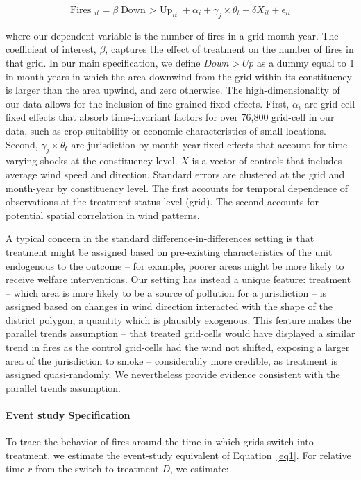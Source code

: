 \documentclass[12pt]{article}
\begin{document}
\begin{equation}\label{eq1}
 \text{Fires }_{i t}=\beta \text{{Down $>$ Up}}_{i t}+ \alpha_{i}+ \gamma_{j} \times \theta_{t}+ \delta X_{it} + \epsilon_{i t}
\end{equation}

where our dependent variable is the number of fires in a grid month-year. The coefficient of interest, $\beta$, captures the effect of treatment on the number of fires in that grid. In our main specification, we define $Down>Up$ as a dummy equal to 1 in month-years in which the area downwind from the grid within its constituency is larger than the area upwind, and zero otherwise. 
The high-dimensionality of our data allows for the inclusion of fine-grained fixed effects. First, $\alpha_{i}$ are grid-cell fixed effects that absorb time-invariant factors for over 76,800 grid-cell in our data, such as crop suitability or economic characteristics of small locations.  Second,  $\gamma_{j} \times \theta_{t}$ are jurisdiction by month-year fixed effects that account for time-varying shocks at the constituency level. $X$ is a vector of controls that includes average wind speed and direction. Standard errors are clustered at the grid and month-year by constituency level. The first accounts for temporal dependence of observations at the treatment status level (grid). The second accounts for potential spatial correlation in wind patterns.

A typical concern in the standard difference-in-differences setting is that treatment might be assigned based on pre-existing characteristics of the unit endogenous to the outcome -- for example, poorer areas might be more likely to receive welfare interventions. Our setting has instead a unique feature: treatment -- which area is more likely to be a source of pollution for a jurisdiction -- is assigned based on changes in wind direction interacted with the shape of the district polygon, a quantity which is plausibly exogenous. This feature makes the parallel trends assumption -- that treated grid-cells would have displayed a similar trend in fires as the control grid-cells had the wind not shifted, exposing a larger area of the jurisdiction to smoke -- considerably more credible, as treatment is assigned quasi-randomly. We nevertheless provide evidence consistent with the parallel trends assumption.

\paragraph{Event study Specification }
To trace the behavior of fires around the time in which grids switch into treatment, we estimate the event-study equivalent of Equation~\ref{eq1}. For relative time $r$ from the switch to treatment $D$, we estimate:
\end{document}

